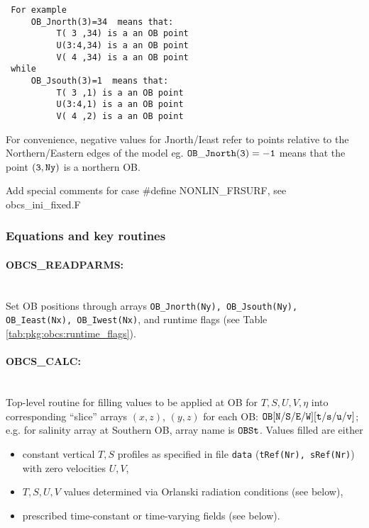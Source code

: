 \begin{verbatim}
 For example
     OB_Jnorth(3)=34  means that:
          T( 3 ,34) is a an OB point
          U(3:4,34) is a an OB point
          V( 4 ,34) is a an OB point
 while
     OB_Jsouth(3)=1  means that:
          T( 3 ,1) is a an OB point
          U(3:4,1) is a an OB point
          V( 4 ,2) is a an OB point
\end{verbatim}

For convenience, negative values for Jnorth/Ieast refer to
points relative to the Northern/Eastern edges of the model
eg. $\tt OB\_Jnorth(3)=-1$  means that the point $\tt (3,Ny)$ 
is a northern OB.

\noindent
\textsf{Add special comments for case \#define NONLIN\_FRSURF,
see obcs\_ini\_fixed.F}


\subsubsection{Equations and key routines
\label{sec:pkg:obcs:equations}}

\paragraph{OBCS\_READPARMS:} ~ \\
Set OB positions through arrays
{\tt OB\_Jnorth(Ny), OB\_Jsouth(Ny), OB\_Ieast(Nx), OB\_Iwest(Nx)},
and runtime flags (see Table \ref{tab:pkg:obcs:runtime_flags}).

\paragraph{OBCS\_CALC:} ~ \\
%
Top-level routine for filling values to be applied at OB for 
$T,S,U,V,\eta$ into corresponding 
``slice'' arrays $(x,z)$, $(y,z)$ for each OB:
$\tt OB[N/S/E/W][t/s/u/v]$; e.g. for salinity array at
Southern OB, array name is $\tt OBSt$.
Values filled are either
%
\begin{itemize}
%
\item
constant vertical $T,S$ profiles as specified in file
{\tt data} ({\tt tRef(Nr), sRef(Nr)}) with zero velocities $U,V$,
%
\item
$T,S,U,V$ values determined via Orlanski radiation conditions
(see below),
%
\item
prescribed time-constant or time-varying fields (see below).
%
\end{itemize}


